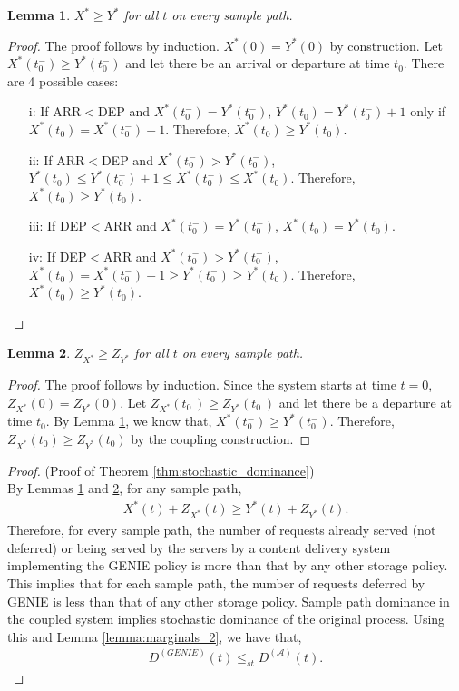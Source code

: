 \documentclass[10pt, conference, letterpaper]{IEEEtran}
\newtheorem{lemma}{Lemma}
\begin{document}
\begin{lemma}
	\label{lemma:x_stochastic_dominance_y}
	$X^* \geq Y^*$ for all $t$ on every sample path.
\end{lemma}
\begin{proof} 
	The proof follows by induction. $X^*(0) = Y^*(0)$ by construction.
	Let $X^*(t_0^-) \geq Y^*(t_0^-)$ and let there be an arrival or departure at time $t_0$. There are 4 possible cases:
	\begin{itemize}
		\item[i:] If ARR$<$DEP and $X^*(t_0^-) = Y^*(t_0^-)$, $Y^*(t_0) = Y^*(t_0^-) + 1$ only if $X^*(t_0) = X^*(t_0^-) + 1$. Therefore, $X^*(t_0) \geq Y^*(t_0)$.
		\item[ii:] If ARR$<$DEP and $X^*(t_0^-) > Y^*(t_0^-)$, $Y^*(t_0) \leq Y^*(t_0^-) + 1 \leq X^*(t_0^-) \leq X^*(t_0)$. Therefore, $X^*(t_0) \geq Y^*(t_0)$.
		\item[iii:] If DEP$<$ARR and $X^*(t_0^-) = Y^*(t_0^-)$, $X^*(t_0) = Y^*(t_0)$.
		\item[iv:] If DEP$<$ARR and $X^*(t_0^-) > Y^*(t_0^-)$, $X^*(t_0) = X^*(t_0^-)-1 \geq Y^*(t_0^-) \geq Y^*(t_0)$. Therefore, $X^*(t_0) \geq Y^*(t_0)$.
	\end{itemize}
\end{proof}

\begin{lemma}
	\label{lemma:departures_stochastic_dominance}
	$Z_{X^*} \geq Z_{Y^*}$ for all $t$ on every sample path.
\end{lemma}
\begin{proof}
	The proof follows by induction. Since the system starts at time $t=0$, $Z_{X^*}(0) = Z_{Y^*}(0)$. Let $Z_{X^*}(t_0^-) \geq Z_{Y^*}(t_0^-)$ and let there be a departure at time $t_0$. By Lemma \ref{lemma:x_stochastic_dominance_y}, we know that, $X^*(t_0^-) \geq Y^*(t_0^-)$. Therefore, $Z_{X^*}(t_0) \geq Z_{Y^*}(t_0)$ by the coupling construction.
\end{proof}



\begin{proof} (Proof of Theorem \ref{thm:stochastic_dominance}) \\
	By Lemmas \ref{lemma:x_stochastic_dominance_y} and \ref{lemma:departures_stochastic_dominance}, for any sample path,
	\begin{eqnarray*}
		X^*(t) + Z_{X^*}(t) \geq Y^*(t) + Z_{Y^*}(t).
	\end{eqnarray*}
	Therefore, for every sample path, the number of requests already served (not deferred) or being served by the servers by a content delivery system implementing the GENIE policy is more than that by any other storage policy. This implies that for each sample path, the number of requests deferred by GENIE is less than that of any other storage policy. Sample path dominance in the coupled system implies stochastic dominance of the original process. Using this and Lemma \ref{lemma:marginals_2}, we have that,
	\begin{eqnarray*}
		D^{(GENIE)}(t) \leq_{st} D^{(\mathcal{A})}(t).
	\end{eqnarray*}
\end{proof}
\end{document}

